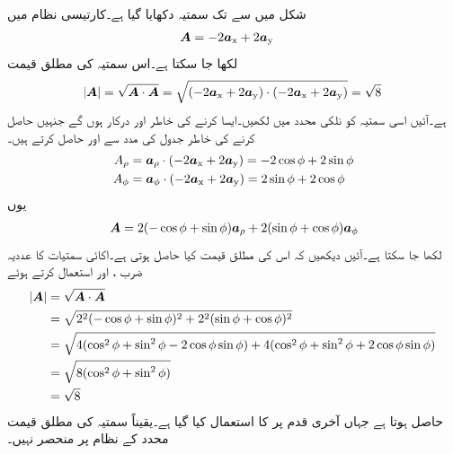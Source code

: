 شکل  میں  سے  تک سمتیہ  دکھایا گیا ہے۔کارتیسی نظام میں 
\begin{align}\label{مساوات_سمتیہ_کارتیسی_نظام_سمتیہ_مثال}
{\ensuremath{{\boldsymbol{A}}}}&=-2{\boldsymbol{a}}_{\textup{x}}+2{\boldsymbol{a}}_{\textup{y}}
\end{align}
لکھا جا سکتا ہے۔اس سمتیہ کی مطلق قیمت
\begin{align*}
\abs{{{\boldsymbol{A}}}}= \sqrt{{{\boldsymbol{A}}} \cdot {\ensuremath{{\boldsymbol{A}}}}}=\sqrt{(-2{\boldsymbol{a}}_{\textup{x}}+2{\boldsymbol{a}}_{\textup{y}}) \cdot (-2{\boldsymbol{a}}_{\textup{x}}+2{\boldsymbol{a}}_{\textup{y}})}=\sqrt{8}
\end{align*}
ہے۔آئیں اسی سمتیہ کو نلکی محدد میں لکھیں۔ایسا کرنے کی خاطر  اور  درکار ہوں گے جنہیں حاصل کرنے کی خاطر جدول   کی مدد سے  اور  حاصل کرتے ہیں۔
\begin{align*}
A_\rho&={\boldsymbol{a}}_{\rho} \cdot (-2{\boldsymbol{a}}_{\textup{x}}+2{\boldsymbol{a}}_{\textup{y}})=-2 \cos \phi +2 \sin \phi\\
A_\phi&={\boldsymbol{a}}_{\phi} \cdot  (-2{\boldsymbol{a}}_{\textup{x}}+2{\boldsymbol{a}}_{\textup{y}})=2 \sin \phi +2 \cos \phi
\end{align*}
یوں
\begin{align}\label{مساوات_سمتیہ_نلکی_نظام_سمتیہ_مثال}
{\ensuremath{{\boldsymbol{A}}}}=2(- \cos \phi + \sin \phi) {\boldsymbol{a}}_{\rho} +2( \sin \phi + \cos \phi){\boldsymbol{a}}_{\phi}
\end{align}
لکھا جا سکتا ہے۔آئیں دیکھیں کہ اس کی مطلق قیمت کیا حاصل ہوتی ہے۔اکائی سمتیات کا عددیہ ضرب ،  اور  استعمال کرتے ہوئے
\begin{align*}
\abs{{{\boldsymbol{A}}}}&=\sqrt{{{\boldsymbol{A}}} \cdot {\ensuremath{{\boldsymbol{A}}}}}\\
&=\sqrt{2^2(- \cos \phi + \sin \phi)^2+2^2( \sin \phi + \cos \phi)^2 }\\
&=\sqrt{4(\cos^2 \phi +\sin^2 \phi -2 \cos \phi \sin \phi)+4(\cos^2 \phi +\sin^2 \phi +2 \cos \phi \sin \phi)}\\
&=\sqrt{8(\cos^2 \phi+\sin^2 \phi)}\\
&=\sqrt{8}
\end{align*}
حاصل ہوتا ہے جہاں آخری قدم پر  کا استعمال کیا گیا ہے۔یقیناً سمتیہ کی مطلق قیمت محدد کے نظام پر منحصر نہیں۔

